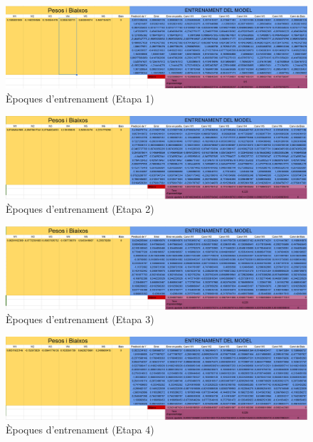 \begin{figure}[H]
    \centering
    \includegraphics[width=1\textwidth]{./figures/Etapa1.png}
    \caption{Èpoques d'entrenament (Etapa 1)}
    \label{f:entrenament}
\end{figure}

\begin{figure}[H]
    \centering
    \includegraphics[width=1\textwidth]{./figures/Etapa2.png}
    \caption{Èpoques d'entrenament (Etapa 2)}
\end{figure}

\begin{figure}[H]
    \centering
    \includegraphics[width=1\textwidth]{./figures/Etapa3.png}
    \caption{Èpoques d'entrenament (Etapa 3)}
\end{figure}

\begin{figure}[H]
    \centering
    \includegraphics[width=1\textwidth]{./figures/Etapa4.png}
    \caption{Èpoques d'entrenament (Etapa 4)}
\end{figure}

